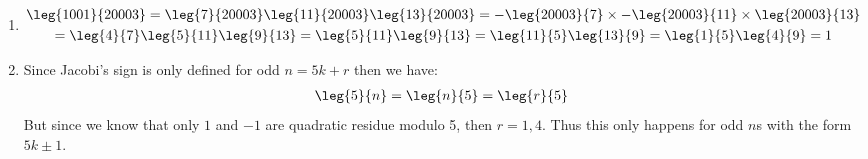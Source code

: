 \begin{enumerate}[label=\ilabel]
    \item
        \begin{gather*}
            \leg{1001}{20003} = \leg{7}{20003} \leg{11}{20003} \leg{13}{20003} = -\leg{20003}{7} \times -\leg{20003}{11} \times \leg{20003}{13}\\
            = \leg{4}{7} \leg{5}{11} \leg{9}{13} = \leg{5}{11} \leg{9}{13} = \leg{11}{5} \leg{13}{9} = \leg{1}{5} \leg{4}{9} = 1
        \end{gather*}        
    
    \item
        Since Jacobi's sign is only defined for odd $n = 5k + r$ then we have:
        \begin{gather*}
            \leg{5}{n} = \leg{n}{5} = \leg{r}{5}
        \end{gather*}
        But since we know that only $1$ and $-1$ are quadratic residue modulo 5, then $r = 1, 4$. Thus this only happens for odd $n$s with the form $5k \pm 1$.
\end{enumerate}